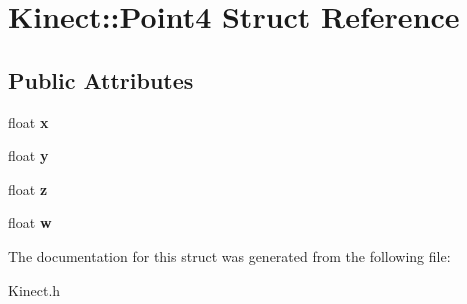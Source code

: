 \hypertarget{structKinect_1_1Point4}{
\section{Kinect::Point4 Struct Reference}
\label{structKinect_1_1Point4}
}
\subsection*{Public Attributes}
\begin{DoxyCompactItemize}
\item 
\hypertarget{structKinect_1_1Point4_a0b589f932cb5c9f93d668e2bd031a09b}{
float {\bfseries x}}
\label{structKinect_1_1Point4_a0b589f932cb5c9f93d668e2bd031a09b}

\item 
\hypertarget{structKinect_1_1Point4_a222f333bc30c4be70befb15841732b13}{
float {\bfseries y}}
\label{structKinect_1_1Point4_a222f333bc30c4be70befb15841732b13}

\item 
\hypertarget{structKinect_1_1Point4_a3a6f111e0525e1d197e9bcfb83d43e20}{
float {\bfseries z}}
\label{structKinect_1_1Point4_a3a6f111e0525e1d197e9bcfb83d43e20}

\item 
\hypertarget{structKinect_1_1Point4_a89941db0ba02d74b6cf94635d8c58827}{
float {\bfseries w}}
\label{structKinect_1_1Point4_a89941db0ba02d74b6cf94635d8c58827}

\end{DoxyCompactItemize}


The documentation for this struct was generated from the following file:\begin{DoxyCompactItemize}
\item 
Kinect.h\end{DoxyCompactItemize}
